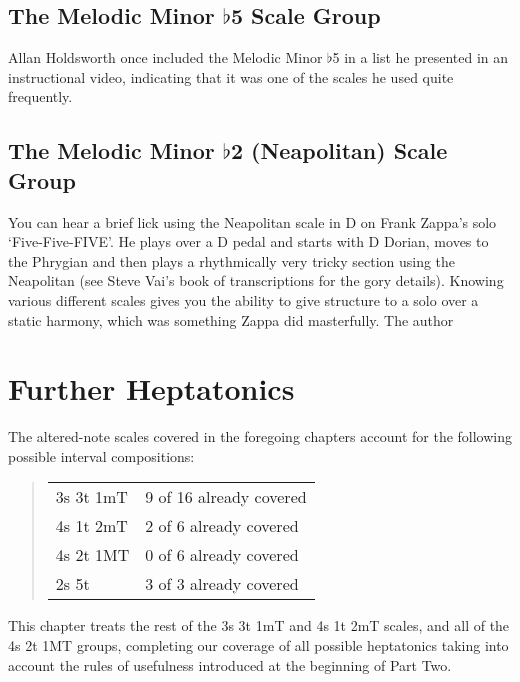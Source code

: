 \documentclass[english]{./gbook}
\newcommand{\titlebreak}{}
\begin{document}
\begin{large}
\section{The Melodic Minor $\flat$5 Scale Group}
Allan Holdsworth once included the Melodic Minor $\flat$5 in a list he presented in an instructional video, indicating that it was one of the scales he used quite frequently.

\section{The Melodic Minor $\flat$2 (Neapolitan) Scale Group}

You can hear a brief lick using the Neapolitan scale in D on Frank Zappa's solo `Five-Five-FIVE'. He plays over a D pedal and starts with D Dorian, moves to the Phrygian and then plays a rhythmically very tricky section using the Neapolitan (see Steve Vai's book of transcriptions for the gory details). Knowing various different scales gives you the ability to give structure to a solo over a static harmony, which was something Zappa did masterfully. The author



\chapter{\mbox{Further} \titlebreak \mbox{Heptatonics}}
The altered-note scales covered in the foregoing chapters account for the following possible interval compositions:
\begin{quote}
\begin{tabular}{ll}
		3s 3t 1mT		&9 of 16 already covered \\
		4s 1t 2mT		&2 of 6 already covered \\
		4s 2t 1MT		&0 of 6 already covered \\
		2s 5t			&3 of 3 already covered \\
\end{tabular}
\end{quote}
This chapter treats the rest of the 3s 3t 1mT and 4s 1t 2mT scales, and all of the 4s 2t 1MT groups, completing our coverage of all possible heptatonics taking into account the rules of usefulness introduced at the beginning of Part Two.


\end{large}
\end{document}

